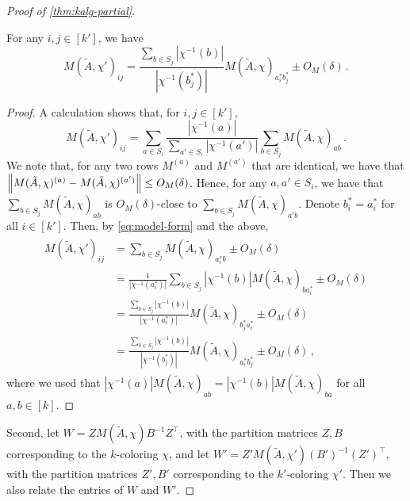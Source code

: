 \begin{proof}[Proof of \cref{thm:kalg-partial}]
    \begin{claim}
    \label{claim:close-entries-M}
    For any $i, j \in [k']$, we have 
    \begin{equation*}
    M(\tilde{A}, \chi')_{ij} = \frac{\sum_{b \in S_j} |\chi^{-1}(b)|}{|\chi^{-1}(b^*_j)|} M(\tilde{A}, \chi)_{a^*_ib^*_{j}} \pm O_M(\delta)\,.
    \end{equation*}
    \end{claim}
    \begin{proof}
    A calculation shows that, for $i, j \in [k']$,
    \begin{equation}
    \label{eq:model-form}
    M(\tilde{A}, \chi')_{ij} = \sum_{a \in S_i} \frac{|\chi^{-1}(a)|}{\sum_{a' \in S_i} |\chi^{-1}(a')|} \sum_{b \in S_j} M(\tilde{A}, \chi)_{ab}\,.
    \end{equation}
    We note that, for any two rows $M^{(a)}$ and $M^{(a')}$ that are identical, we have that\linebreak $\left\lVert M(\tilde{A}, \chi)^{(a)} - M(\tilde{A}, \chi)^{(a')}\right\rVert \leq O_M(\delta)$.
    Hence, for any $a, a' \in S_i$, we have that $\sum_{b \in S_j} M(\tilde{A}, \chi)_{ab}$ is $O_M(\delta)$-close to $\sum_{b \in S_j} M(\tilde{A}, \chi)_{a'b}$.
    Denote $b_i^* = a_i^*$ for all $i \in [k']$.
    Then, by \cref{eq:model-form} and the above,
    \begin{align*}
    \begin{split}
    \label{eq:mchi}
    M(\tilde{A}, \chi')_{ij}
    &= \sum_{b \in S_j} M(\tilde{A}, \chi)_{a^*_i b} \pm O_M(\delta)\\
    &= \frac{1}{|\chi^{-1}(a^*_i)|} \sum_{b \in S_j} |\chi^{-1}(b)| M(\tilde{A}, \chi)_{b a^*_i} \pm O_M(\delta)\\
    &= \frac{\sum_{b \in S_j} |\chi^{-1}(b)|}{|\chi^{-1}(a^*_i)|} M(\tilde{A}, \chi)_{b^*_{j} a^*_i} \pm O_M(\delta)\\
    &= \frac{\sum_{b \in S_j} |\chi^{-1}(b)|}{|\chi^{-1}(b^*_j)|} M(\tilde{A}, \chi)_{a^*_ib^*_{j}} \pm O_M(\delta)\,,
    \end{split}
    \end{align*}
    where we used that $|\chi^{-1}(a)| M(\tilde{A},\chi)_{ab} = |\chi^{-1}(b)| M(\tilde{A},\chi)_{ba}$ for all $a, b \in [k]$.
    \end{proof}

    Second, let $W = Z M(\tilde{A}, \chi) B^{-1} Z^\top$, with the partition matrices $Z, B$ corresponding to the $k$-coloring $\chi$, and let $W' = Z' M(\tilde{A}, \chi') (B')^{-1} (Z')^\top$, with the partition matrices $Z', B'$ corresponding to the $k'$-coloring $\chi'$.
    Then we also relate the entries of $W$ and $W'$.


\end{proof}
